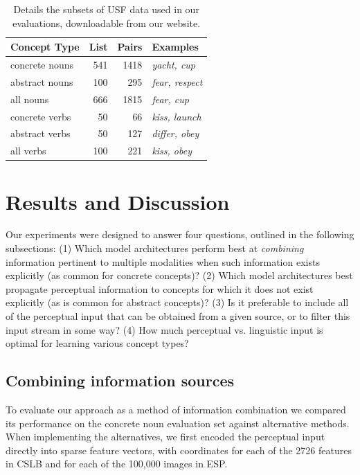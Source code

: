 \documentclass[11pt]{article}
\begin{document}
 \begin{table}[t]\begin{center}\begin{tabular}{l|r|r|p{2.1cm}}



\bf Concept Type & \bf  List & \bf Pairs & \bf Examples \\ 

\hline concrete nouns & 541 & 1418 & \emph{yacht, cup} \\

abstract nouns & 100 & 295 & \emph{fear, respect} \\

all nouns & 666 & 1815 & \emph{fear, cup} \\

concrete verbs & 50 & 66 & \emph{kiss, launch} \\

abstract verbs & 50 & 127 & \emph{differ, obey} \\

all verbs & 100 & 221 & \emph{kiss, obey} \\

\end{tabular}\end{center}\caption{\label{font-table} Details the subsets of USF data used in our evaluations, downloadable from our website.}\end{table}






\section{Results and Discussion}

Our experiments were designed to answer four questions, outlined in the following subsections: (1) Which model architectures perform best at \emph{combining} information pertinent to multiple modalities when such information exists explicitly (as common for concrete concepts)? (2) Which model architectures best propagate perceptual information to concepts for which it does not exist explicitly (as is common for abstract concepts)? (3) Is it preferable to include all of the perceptual input that can be obtained from a given source, or to filter this input stream in some way? (4) How much perceptual vs. linguistic input is optimal for learning various concept types? 

\subsection{Combining information sources} To evaluate our approach as a method of information combination we compared its performance on the concrete noun evaluation set against alternative methods. When implementing the alternatives, we first encoded the perceptual input directly into sparse feature vectors, with coordinates for each of the 2726 features in CSLB and for each of the 100,000 images in ESP. 
\end{document}
